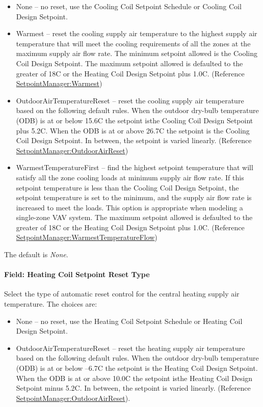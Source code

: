 \begin{itemize}
\item
  None -- no reset, use the Cooling Coil Setpoint Schedule or Cooling Coil Design Setpoint.
\item
  Warmest -- reset the cooling supply air temperature to the highest supply air temperature that will meet the cooling requirements of all the zones at the maximum supply air flow rate. The minimum setpoint allowed is the Cooling Coil Design Setpoint. The maximum setpoint allowed is defaulted to the greater of 18C or the Heating Coil Design Setpoint plus 1.0C. (Reference \hyperref[setpointmanagerwarmest]{SetpointManager:Warmest})
\item
  OutdoorAirTemperatureReset -- reset the cooling supply air temperature based on the following default rules. When the outdoor dry-bulb temperature (ODB) is at or below 15.6C the setpoint isthe Cooling Coil Design Setpoint plus 5.2C. When the ODB is at or above 26.7C the setpoint is the Cooling Coil Design Setpoint. In between, the setpoint is varied linearly. (Reference \hyperref[setpointmanageroutdoorairreset]{SetpointManager:OutdoorAirReset})
\item
  WarmestTemperatureFirst -- find the highest setpoint temperature that will satisfy all the zone cooling loads at minimum supply air flow rate. If this setpoint temperature is less than the Cooling Coil Design Setpoint, the setpoint temperature is set to the minimum, and the supply air flow rate is increased to meet the loads. This option is appropriate when modeling a single-zone VAV system. The maximum setpoint allowed is defaulted to the greater of 18C or the Heating Coil Design Setpoint plus 1.0C. (Reference \hyperref[setpointmanagerwarmesttemperatureflow]{SetpointManager:WarmestTemperatureFlow})
\end{itemize}

The default is \emph{None}.

\paragraph{Field: Heating Coil Setpoint Reset Type}\label{field-heating-coil-setpoint-reset-type-1}

Select the type of automatic reset control for the central heating supply air temperature. The choices are:

\begin{itemize}
\item
  None -- no reset, use the Heating Coil Setpoint Schedule or Heating Coil Design Setpoint.
\item
  OutdoorAirTemperatureReset -- reset the heating supply air temperature based on the following default rules. When the outdoor dry-bulb temperature (ODB) is at or below --6.7C the setpoint is the Heating Coil Design Setpoint. When the ODB is at or above 10.0C the setpoint isthe Heating Coil Design Setpoint minus 5.2C. In between, the setpoint is varied linearly. (Reference \hyperref[setpointmanageroutdoorairreset]{SetpointManager:OutdoorAirReset}).
\end{itemize}

